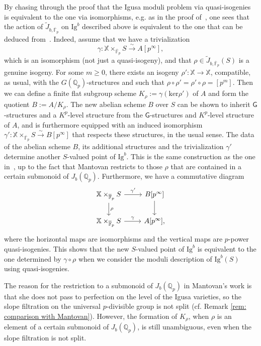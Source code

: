 \documentclass[letterpaper,11pt]{amsart}
\begin{document}
By chasing through the proof that the Igusa moduli problem via quasi-isogenies is equivalent to the one via isomorphisms, e.g. as in the proof of~\cite[Lemma 4.2.2]{Caraiani-Tamiozzo}, one sees that the action of $\widetilde{J}_{b, \overline{\mathbb{F}}_p}$ on $\mathrm{Ig}^b$ described above is equivalent to the one that can be deduced from~\cite[\S 4]{mantovan-PEL}. Indeed, assume that we have a trivialization 
\[
\gamma: \mathbb{X}\times_{\overline{\mathbb{F}}_p} S \stackrel{\sim}{\to} A[p^\infty],
\]
which is an isomorphism (not just a quasi-isogeny), and that $\rho\in \widetilde{J}_{b, \overline{\mathbb{F}}_p}(S)$ is a genuine isogeny. For some $m\geq 0$, there exists an isogeny $\rho': \mathbb{X}\to \mathbb{X}$, compatible, as usual, with the $G(\mathbb{Q}_p)$-structures and such that $\rho\circ \rho' = \rho'\circ \rho = [p^m]$.  
Then we can define a finite flat subgroup scheme $K_\rho:=\gamma(\mathrm{ker}\rho')$ of $A$ and form the quotient $B:=A/K_\rho$. The new abelian scheme $B$ over $S$ can be shown to inherit $\mathsf{G}$-structures and a $K^p$-level structure from the $\mathsf{G}$-structures and $K^p$-level structure of $A$, and is furthermore equipped with an induced isomorphism 
$\gamma': \mathbb{X}\times_{\overline{\mathbb{F}}_p} S\stackrel{\sim}{\to} B[p^\infty]$
that respects these structures, in the usual sense. The data of the abelian scheme $B$, its additional structures and the trivialization $\gamma'$ determine another $S$-valued point of $\mathrm{Ig}^b$. This is the same construction as the one in~\cite[\S 4]{mantovan-PEL}, up to the fact that Mantovan restricts to those $\rho$ that are contained in a certain submonoid of $J_b(\mathbb{Q}_p)$. Furthermore, we have a commutative diagram 
\begin{equation}
\begin{tikzcd}
    \mathbb{X}\times_{\overline{\mathbb{F}}_p}S \arrow[r, "\gamma'"] \arrow[d, "\rho"] & B[p^\infty]\arrow[d] \\ 
      \mathbb{X}\times_{\overline{\mathbb{F}}_p}S \arrow[r, "\gamma"] & A[p^\infty],
\end{tikzcd}
\end{equation}
where the horizontal maps are isomorphisms and the vertical maps are $p$-power quasi-isogenies. This shows that the new $S$-valued point of $\mathrm{Ig}^b$ is equivalent to the one determined by $\gamma\circ \rho$ when we consider the moduli description of $\mathrm{Ig}^b(S)$ using quasi-isogenies. 

\begin{remark}\label{rem: comparison with Mantovan Jb} The reason for the restriction to a submonoid of $J_b(\mathbb{Q}_p)$ in Mantovan's work is that she does not pass to perfection on the level of the Igusa varieties, so the slope filtration on the universal $p$-divisible group is not split (cf. Remark \ref{rem: comparison with Mantovan}). However, the formation of $K_{\rho}$, when $\rho$ is an element of a certain submonoid of $J_b(\mathbb{Q}_p)$, is still unambiguous, even when the slope filtration is not split. 
\end{remark}
\end{document}
